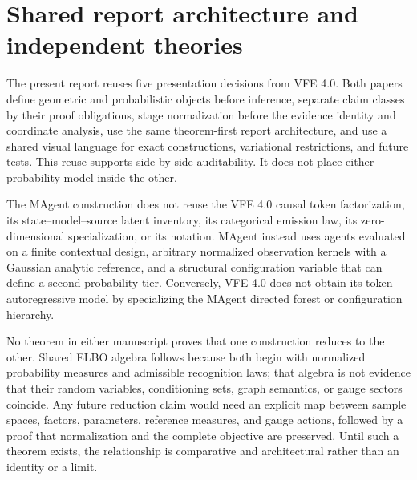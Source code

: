 \section{Shared report architecture and independent theories}

The present report reuses five presentation decisions from VFE 4.0. Both papers define geometric and probabilistic objects before inference, separate claim classes by their proof obligations, stage normalization before the evidence identity and coordinate analysis, use the same theorem-first report architecture, and use a shared visual language for exact constructions, variational restrictions, and future tests. This reuse supports side-by-side auditability. It does not place either probability model inside the other.

The MAgent construction does not reuse the VFE 4.0 causal token factorization, its state--model--source latent inventory, its categorical emission law, its zero-dimensional specialization, or its notation. MAgent instead uses agents evaluated on a finite contextual design, arbitrary normalized observation kernels with a Gaussian analytic reference, and a structural configuration variable that can define a second probability tier. Conversely, VFE 4.0 does not obtain its token-autoregressive model by specializing the MAgent directed forest or configuration hierarchy.

No theorem in either manuscript proves that one construction reduces to the other. Shared ELBO algebra follows because both begin with normalized probability measures and admissible recognition laws; that algebra is not evidence that their random variables, conditioning sets, graph semantics, or gauge sectors coincide. Any future reduction claim would need an explicit map between sample spaces, factors, parameters, reference measures, and gauge actions, followed by a proof that normalization and the complete objective are preserved. Until such a theorem exists, the relationship is comparative and architectural rather than an identity or a limit.
